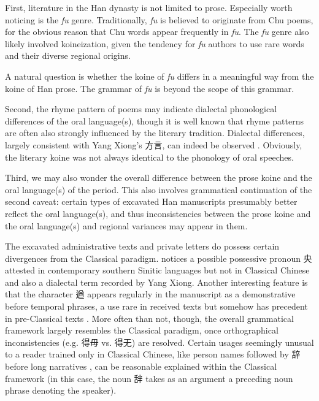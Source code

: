 \documentclass[UTF8, a4paper, oneside, scheme=plain, 12pt]{ctexrep}
\newcommand{\form}[1]{\emph{#1}}
\begin{document}
First, literature in the Han dynasty is not limited to prose.
Especially worth noticing is the \form{fu} genre.
Traditionally, \form{fu} is believed to originate from Chu poems,
for the obvious reason that Chu words appear frequently in \form{fu}.
The \form{fu} genre also likely involved koineization,
given the tendency for \form{fu} authors to use rare words and their diverse regional origins.

A natural question is whether the koine of \form{fu} differs in a meaningful way from the koine of Han prose. The grammar of \form{fu} is beyond the scope of this grammar.


Second, the rhyme pattern of poems may indicate dialectal phonological differences of the oral language(s),
though it is well known that rhyme patterns are often also strongly influenced by the literary tradition.
Dialectal differences, largely consistent with Yang Xiong's 方言, can indeed be observed \citep{zhang2023rhyme}.
Obviously, the literary koine was not always identical to the phonology of oral speeches.

Third, we may also wonder the overall difference between the prose koine and the oral language(s) of the period.
This also involves grammatical continuation of the second caveat:
certain types of excavated Han manuscripts presumably better reflect the oral language(s),
and thus inconsistencies between the prose koine and the oral language(s) and regional variances may appear in them.

The excavated administrative texts and private letters do possess certain divergences from the Classical paradigm.
\citet{ren2022robbery} notices a possible possessive pronoun 央 attested in contemporary southern Sinitic languages but not in Classical Chinese
and also a dialectal term recorded by Yang Xiong.
Another interesting feature is that the character 遒 appears regularly in the manuscript as a demonstrative before temporal phrases,
a use rare in received texts but somehow has precedent in pre-Classical texts \citep{zhang2004nai}.
More often than not, though, the overall grammatical framework largely resembles the Classical paradigm,
once orthographical inconsistencies (e.g. 得毋 vs. 得无) are resolved.
Certain usages seemingly unusual to a reader trained only in Classical Chinese, like person names followed by 辞 before long narratives \citep{ren2022robbery},
can be reasonable explained within the Classical framework (in this case, the noun 辞 takes as an argument a preceding noun phrase denoting the speaker). 
\end{document}
